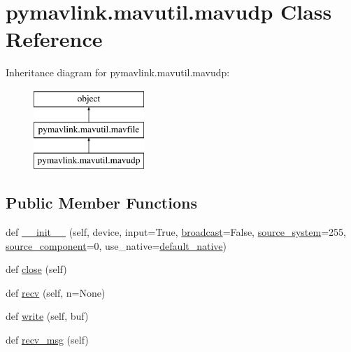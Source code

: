 \hypertarget{classpymavlink_1_1mavutil_1_1mavudp}{}\section{pymavlink.\+mavutil.\+mavudp Class Reference}
\label{classpymavlink_1_1mavutil_1_1mavudp}
Inheritance diagram for pymavlink.\+mavutil.\+mavudp\+:\begin{figure}[H]
\begin{center}
\leavevmode
\includegraphics[height=3.000000cm]{classpymavlink_1_1mavutil_1_1mavudp}
\end{center}
\end{figure}
\subsection*{Public Member Functions}
\begin{DoxyCompactItemize}
\item 
def \mbox{\hyperlink{classpymavlink_1_1mavutil_1_1mavudp_a6adc1a8a99b6ded71d38be346b2f41c7}{\+\_\+\+\_\+init\+\_\+\+\_\+}} (self, device, input=True, \mbox{\hyperlink{classpymavlink_1_1mavutil_1_1mavudp_ac5bbd2a998cfe14d2f25dc88a56817bb}{broadcast}}=False, \mbox{\hyperlink{classpymavlink_1_1mavutil_1_1mavfile_a02c06667c79f4414ed9c4ee6a8dec903}{source\+\_\+system}}=255, \mbox{\hyperlink{classpymavlink_1_1mavutil_1_1mavfile_a84e307f771a9ac2aed567831845c417e}{source\+\_\+component}}=0, use\+\_\+native=\mbox{\hyperlink{namespacepymavlink_1_1mavutil_a21ce9da7b698a7bc21c44b9f77341b62}{default\+\_\+native}})
\item 
def \mbox{\hyperlink{classpymavlink_1_1mavutil_1_1mavudp_ae4b43c09ce3d1304545c9a333bec9cff}{close}} (self)
\item 
def \mbox{\hyperlink{classpymavlink_1_1mavutil_1_1mavudp_a0381f8262ab6149604e902339c5a4a53}{recv}} (self, n=None)
\item 
def \mbox{\hyperlink{classpymavlink_1_1mavutil_1_1mavudp_a517fd3e5a3ad03f03ba505ff8b4d7572}{write}} (self, buf)
\item 
def \mbox{\hyperlink{classpymavlink_1_1mavutil_1_1mavudp_aeb1b82765793d5de815c95caf6863953}{recv\+\_\+msg}} (self)
\end{DoxyCompactItemize}
